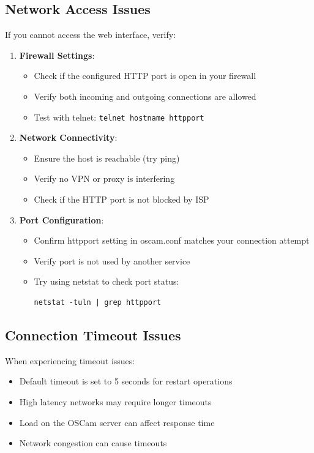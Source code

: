 \documentclass[a4paper,11pt]{report}
\begin{document}
\subsection{Network Access Issues}
\begin{procedurebox}
If you cannot access the web interface, verify:
\begin{enumerate}
    \item \textbf{Firewall Settings}:
    \begin{itemize}
        \item Check if the configured HTTP port is open in your firewall
        \item Verify both incoming and outgoing connections are allowed
        \item Test with telnet: \verb|telnet hostname httpport|
    \end{itemize}
    \item \textbf{Network Connectivity}:
    \begin{itemize}
        \item Ensure the host is reachable (try ping)
        \item Verify no VPN or proxy is interfering
        \item Check if the HTTP port is not blocked by ISP
    \end{itemize}
    \item \textbf{Port Configuration}:
    \begin{itemize}
        \item Confirm httpport setting in oscam.conf matches your connection attempt
        \item Verify port is not used by another service
        \item Try using netstat to check port status:
        \begin{verbatim}
netstat -tuln | grep httpport
        \end{verbatim}
    \end{itemize}
\end{enumerate}
\end{procedurebox}

\subsection{Connection Timeout Issues}
\begin{notebox}
When experiencing timeout issues:
\begin{itemize}
    \item Default timeout is set to 5 seconds for restart operations
    \item High latency networks may require longer timeouts
    \item Load on the OSCam server can affect response time
    \item Network congestion can cause timeouts
\end{itemize}
\end{notebox}
\end{document}

